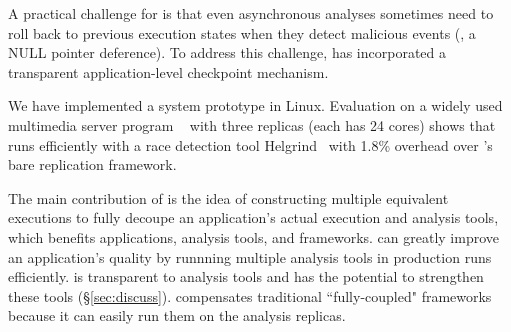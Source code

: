 A practical challenge for \xxx is that even asynchronous analyses sometimes
need to roll back to previous execution states when they detect malicious
events (\eg, a NULL pointer deference). To address this challenge, \xxx has
incorporated a transparent application-level checkpoint mechanism.


We have implemented a \xxx system prototype in Linux. Evaluation on a widely 
used multimedia server program \mediatomb~\cite{mediatomb} with three replicas
(each has 24 cores) shows that \xxx runs efficiently with a race detection tool 
Helgrind~\cite{valgrind:pldi} with 1.8\% overhead over \xxx's bare replication 
framework.


The main contribution of \xxx is the idea of constructing multiple equivalent
executions to fully decoupe an application's actual execution and analysis
tools, which benefits applications, analysis tools, and frameworks. \xxx can
greatly improve an application's quality by runnning multiple analysis tools in
production runs efficiently. \xxx is transparent to analysis tools and has the
potential to strengthen these tools (\S\ref{sec:discuss}). \xxx compensates
traditional ``fully-coupled" frameworks because it can easily run them on the
analysis replicas.












